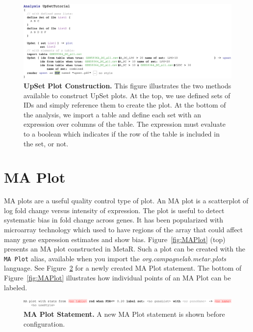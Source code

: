 \begin{figure}[h!tbp]
  \centering
  \includegraphics[width=\figWidthWide]{figures/UpSetIllustration-1.pdf}
\caption[UpSet Plot Construction.]{\textbf{UpSet Plot Construction.} This figure illustrates the two methods available to construct UpSet plots. At the top, we use defined sets of IDs and simply reference them to create the plot. At the bottom of the analysis, we import a table and define each set with an expression over columns of the table. The expression must evaluate to a boolean which indicates if the row of the table is included in the set, or not.}
\label{fig:AnalysisWithUpset}
\end{figure}

\section{MA Plot}
MA plots are a useful quality control type of plot. An MA plot is a scatterplot of log fold change versus intensity of expression. The plot is useful to detect systematic bias in fold change across genes. It has been popularized with microarray technology which used to have regions of the array that could affect many gene expression estimates and show bias. Figure~\ref{fig:MAPlot} (top) presents an MA plot constructed in MetaR. Such a plot can be created with the \texttt{MA Plot} alias, available when you import the \textit{org.campagnelab.metar.plots} language. See Figure~\ref{fig:NewMAPlot} for a newly created MA Plot statement. The bottom of Figure~\ref{fig:MAPlot} illustrates how individual points of an MA Plot can be labeled.


\begin{figure}[h!tbp]
  \centering
  \includegraphics[width=\figWidthWide]{figures/NewMAPlot-1.pdf}
\caption[MA Plot Statement.]{\textbf{MA Plot Statement.} A new MA Plot statement is shown before configuration.}
\label{fig:NewMAPlot}
\end{figure}
 
